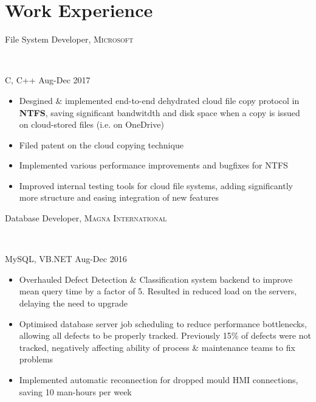 \documentclass[a4paper,10pt]{article}
\begin{document}
\begin{minipage}[t]{0.60\textwidth} %

\section{Work Experience}
\medskip

\begin{large}
File System Developer, \textsc{Microsoft}
\end{large}\\
\medskip
\begin{footnotesize}
C, C++ \hfill Aug-Dec 2017
\end{footnotesize}
\begin{itemize}
    \item {Desgined \& implemented end-to-end dehydrated cloud file copy protocol in \textbf{NTFS}, saving significant bandwitdth and disk space when a copy is issued on cloud-stored files (i.e. on OneDrive)}
    \item {Filed patent on the cloud copying technique}   %
    \item {Implemented various performance improvements and bugfixes for NTFS}
    \item {Improved internal testing tools for cloud file systems, adding significantly more structure and easing integration of new features}
\end{itemize}
\bigskip

\begin{large}
Database Developer, \textsc{Magna International}
\end{large}\\
\medskip
\begin{footnotesize}
MySQL, VB.NET \hfill Aug-Dec 2016
\end{footnotesize}
\begin{itemize}
    \item {Overhauled Defect Detection \& Classification system backend to improve mean query time by a factor of 5. Resulted in reduced load on the servers, delaying the need to upgrade}
    \item {Optimised database server job scheduling to reduce performance bottlenecks, allowing all defects to be properly tracked. Previously 15\% of defects were not tracked, negatively affecting ability of process \& maintenance teams to fix problems}
    \item {Implemented automatic reconnection for dropped mould HMI connections, saving 10 man-hours per week}
\end{itemize}
\bigskip


\end{minipage}
\end{document}

